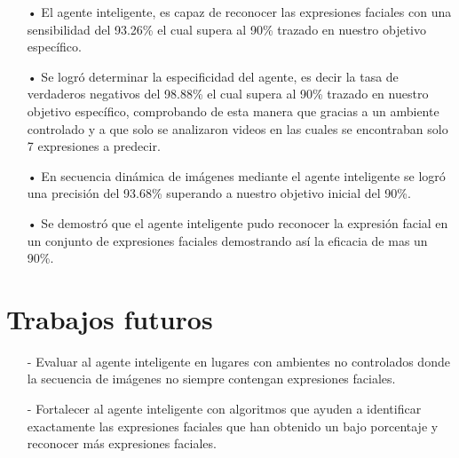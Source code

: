 \begin{itemize}
\item[•] El agente inteligente, es capaz de reconocer las expresiones faciales con una sensibilidad del 93.26\% el cual supera al 90\% trazado en nuestro objetivo específico.
\item[•] Se logró determinar la especificidad del agente, es decir la tasa de verdaderos negativos del 98.88\% el cual supera al 90\% trazado en nuestro objetivo específico, comprobando de esta manera que gracias a un ambiente controlado y a que solo se analizaron videos en las cuales se encontraban solo 7 expresiones a predecir.
\item[•] En secuencia dinámica de imágenes mediante el agente inteligente se logró una precisión del 93.68\% superando a nuestro objetivo inicial del 90\%.
\item[•] Se demostró que el agente inteligente pudo reconocer la expresión facial en un conjunto de expresiones faciales demostrando así la eficacia de mas un 90\%.
\end{itemize}

\section{Trabajos futuros}

\begin{itemize}
\item[-] Evaluar al agente inteligente en lugares con ambientes no controlados donde la secuencia de imágenes no siempre contengan expresiones faciales.
\item[-] Fortalecer al agente inteligente con algoritmos que ayuden a identificar exactamente las expresiones faciales que han obtenido un bajo porcentaje y reconocer más expresiones faciales.
\end{itemize}


